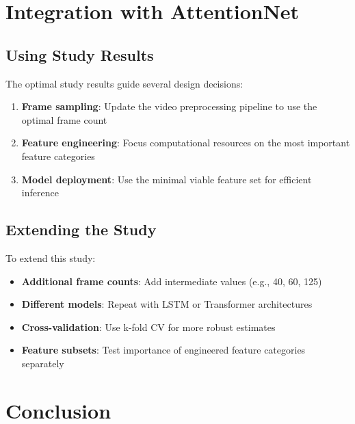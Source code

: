 \documentclass[11pt,a4paper]{article}
\begin{document}
\section{Integration with AttentionNet}\label{sec:integration}

\subsection{Using Study Results}

The optimal study results guide several design decisions:

\begin{enumerate}
    \item \textbf{Frame sampling}: Update the video preprocessing pipeline to use the optimal frame count
    \item \textbf{Feature engineering}: Focus computational resources on the most important feature categories
    \item \textbf{Model deployment}: Use the minimal viable feature set for efficient inference
\end{enumerate}

\subsection{Extending the Study}

To extend this study:

\begin{itemize}
    \item \textbf{Additional frame counts}: Add intermediate values (e.g., 40, 60, 125)
    \item \textbf{Different models}: Repeat with LSTM or Transformer architectures
    \item \textbf{Cross-validation}: Use k-fold CV for more robust estimates
    \item \textbf{Feature subsets}: Test importance of engineered feature categories separately
\end{itemize}

\section{Conclusion}\label{sec:conclusion}
\end{document}
